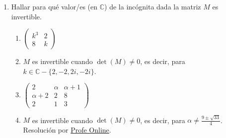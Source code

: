 \documentclass[a4paper]{article}
\newcommand{\answer}{\item[**]}
\newcommand{\exercise}{\item}
\begin{document}
\begin{enumerate}
\begin{multicols}{2}
\begin{enumerate} [label=(\alph*)]
		\item $\begin{vmatrix} 4 & 2x-2 & 0 \\ 3 & 5 & 1 \\ 1 & 4 & x\end{vmatrix}=14$
		\answer $x=2$ o $x=\frac{8}{3}$. Resolución por \href{https://youtu.be/mjS7OMrtNd8}{Mate Profesor Rosado}

		\item $\begin{vmatrix} 2 & x & x+1 \\ x+2 & 2 & 8 \\ 2 & 1 & 3\end{vmatrix}=0$
		\answer $x=\displaystyle\frac{9\pm\sqrt{33}}{4}$. Resolución por \href{https://youtu.be/nJRWcW-m7UU}{Profe Online}

		\item $\begin{vmatrix} 1-\lambda & -1 & 0 \\ -1 & 2-\lambda & -1 \\ 0 & -1 & 1-\lambda\end{vmatrix}=0$
		\answer $\lambda=0$, $\lambda=1$ o $\lambda=2$. Resolución por \href{https://youtu.be/YCZd_BWyE0o}{Matemático Compulsivo}

	\end{enumerate}
	\end{multicols}

	\exercise Hallar para qué valor/es (en $\mathbb{C}$) de la incógnita dada la matriz $M$ es invertible.
	\begin{multicols}{2}
	\begin{enumerate} [label=(\alph*)]

		\item $\begin{pmatrix} k^3 & 2 \\ 8 & k \end{pmatrix}$
		\answer $M$ es invertible cuando $\det(M)\neq0$, es decir, para $k\in\mathbb{C}-\{2,-2,2i,-2i\}$.

		\item $\begin{pmatrix} 2 & \alpha & \alpha+1 \\ \alpha+2 & 2 & 8 \\ 2 & 1 & 3\end{pmatrix}$
		\answer $M$ es invertible cuando $\det(M)\neq0$, es decir, para $\alpha\neq\displaystyle\frac{9\pm\sqrt{33}}{4}$. Resolución por \href{https://youtu.be/nJRWcW-m7UU}{Profe Online}.


\end{enumerate}
\end{multicols}
\end{enumerate}
\end{document}
